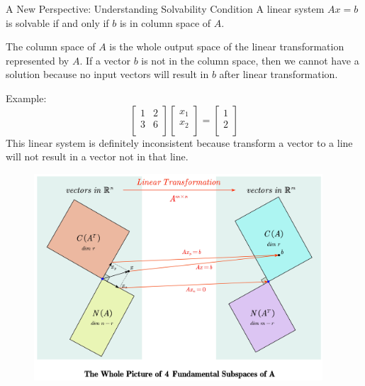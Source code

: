 \documentclass{beamer}
\begin{document}
\begin{frame}{A New Perspective: Understanding Solvability Condition}
A linear system $Ax=b$ is solvable if and only if $b$ is in column space of $A$.

\vspace{3pt}
The column space of $A$ is the whole output space of the linear transformation represented by $A$. If a vector $b$ is not in the column space, then we cannot have a solution because no input vectors will result in $b$ after linear transformation.

\vspace{3pt}
Example:
\begin{equation*}
    \left[ \begin{matrix}
        1&		2\\
        3&		6\\
    \end{matrix} \right] \left[ \begin{array}{c}
        x_1\\
        x_2\\
    \end{array} \right] =\left[ \begin{array}{c}
        1\\
        2\\
    \end{array} \right]
\end{equation*}
This linear system is definitely inconsistent because transform a vector to a line will not result in a vector not in that line.
\end{frame}

\begin{frame}
    \begin{figure}
        \includegraphics[width=0.96\textwidth]{WHOLE.jpg}
    \end{figure}
\end{frame}
\end{document}
